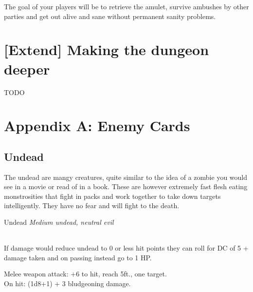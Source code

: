 \documentclass[10pt,twoside,twocolumn]{article}
\begin{document}
The goal of your players will be to retrieve the amulet, survive ambushes by other parties and get out alive and sane without permanent sanity problems.

\section{[Extend] Making the dungeon deeper}
TODO \\

\section{Appendix A: Enemy Cards}

\subsection{Undead}

\begin{quotebox}
The undead are mangy creatures, quite similar to the idea of a zombie you would see in a movie or read of in a book. These are however extremely fast flesh eating monstrosities that fight in packs and work together to take down targets intelligently. They have no fear and will fight to the death.
\end{quotebox}

\begin{monsterbox}{Undead}
	\textit{Medium undead, neutral evil}\\
	\hline
	\basics[%
	armorclass = 14,
	hitpoints  = 22 (3d8 + 9),
	speed      = 30 ft
	]
	\hline
	\stats[
	STR = 13 (+1),
	DEX = 6 (-2),
	CON = 16 (+3),
	INT = 13 (+2),
	WIS = 6 (-2),
	CHA = 5 (-3)
	]
	\hline
	\details[%
	languages = {Understands common, can't speak},
	]
	\hline \\[1mm]
	\begin{monsteraction}
		If damage would reduce undead to 0 or less hit points they can roll for DC of 5 + damage taken and on passing instead go to 1 HP.
	\end{monsteraction}
	\begin{monsteraction}[Slam.]
		Melee weapon attack: +6 to hit, reach 5ft., one target. \\
		
		On hit: (1d8+1) + 3 bludgeoning damage.
	\end{monsteraction}
\end{monsterbox}
\end{document}
